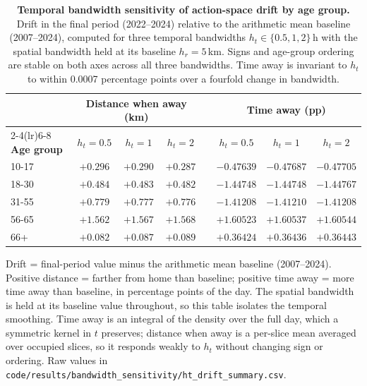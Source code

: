 \begin{table}[htbp]
\centering
\begin{threeparttable}
\caption{\textbf{Temporal bandwidth sensitivity of action-space drift by age group.} Drift in the final period (2022--2024) relative to the arithmetic mean baseline (2007--2024), computed for three temporal bandwidths $h_t \in \{0.5, 1, 2\}$\,h with the spatial bandwidth held at its baseline $h_r=5$\,km. Signs and age-group ordering are stable on both axes across all three bandwidths. Time away is invariant to $h_t$ to within 0.0007 percentage points over a fourfold change in bandwidth.}
\label{tab:ht_sensitivity}
\begin{tabular}{lccccccc}
\toprule
 & \multicolumn{3}{c}{\textbf{Distance when away (km)}} & & \multicolumn{3}{c}{\textbf{Time away (pp)}} \\
\cmidrule(lr){2-4}\cmidrule(lr){6-8}
\textbf{Age group} & $h_t=0.5$ & $h_t=1$ & $h_t=2$ & & $h_t=0.5$ & $h_t=1$ & $h_t=2$ \\
\midrule
10-17 & $+0.296$ & $+0.290$ & $+0.287$ & & $-0.47639$ & $-0.47687$ & $-0.47705$ \\
18-30 & $+0.484$ & $+0.483$ & $+0.482$ & & $-1.44748$ & $-1.44748$ & $-1.44767$ \\
31-55 & $+0.779$ & $+0.777$ & $+0.776$ & & $-1.41208$ & $-1.41210$ & $-1.41208$ \\
56-65 & $+1.562$ & $+1.567$ & $+1.568$ & & $+1.60523$ & $+1.60537$ & $+1.60544$ \\
66+ & $+0.082$ & $+0.087$ & $+0.089$ & & $+0.36424$ & $+0.36436$ & $+0.36443$ \\
\bottomrule
\end{tabular}
\begin{tablenotes}
\footnotesize
\item Drift = final-period value minus the arithmetic mean baseline (2007--2024). Positive distance = farther from home than baseline; positive time away = more time away than baseline, in percentage points of the day. The spatial bandwidth is held at its baseline value throughout, so this table isolates the temporal smoothing. Time away is an integral of the density over the full day, which a symmetric kernel in $t$ preserves; distance when away is a per-slice mean averaged over occupied slices, so it responds weakly to $h_t$ without changing sign or ordering. Raw values in \texttt{code/results/bandwidth\_sensitivity/ht\_drift\_summary.csv}.
\end{tablenotes}
\end{threeparttable}
\end{table}
